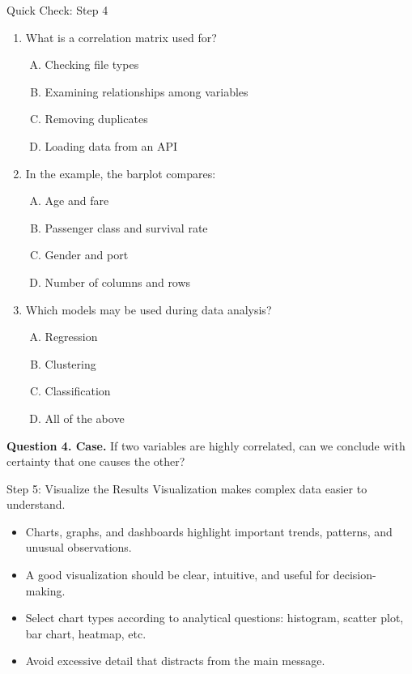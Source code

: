 \documentclass[aspectratio=169,11pt]{beamer}
\newcommand{\quiztitle}[1]{\textbf{\textcolor{QuizOrange}{#1}}}
\begin{document}
\begin{frame}{Quick Check: Step 4}
\begin{enumerate}
  \item What is a correlation matrix used for?
  \begin{enumerate}[A.]
    \item Checking file types \item Examining relationships among variables \item Removing duplicates \item Loading data from an API
  \end{enumerate}
  \item In the example, the barplot compares:
  \begin{enumerate}[A.]
    \item Age and fare \item Passenger class and survival rate \item Gender and port \item Number of columns and rows
  \end{enumerate}
  \item Which models may be used during data analysis?
  \begin{enumerate}[A.]
    \item Regression \item Clustering \item Classification \item All of the above
  \end{enumerate}
\end{enumerate}
\quiztitle{Question 4. Case.} If two variables are highly correlated, can we conclude with certainty that one causes the other?
\end{frame}

\begin{frame}{Step 5: Visualize the Results}
Visualization makes complex data easier to understand.
\begin{itemize}
  \item Charts, graphs, and dashboards highlight important trends, patterns, and unusual observations.
  \item A good visualization should be clear, intuitive, and useful for decision-making.
  \item Select chart types according to analytical questions: histogram, scatter plot, bar chart, heatmap, etc.
  \item Avoid excessive detail that distracts from the main message.
\end{itemize}
\end{frame}
\end{document}
